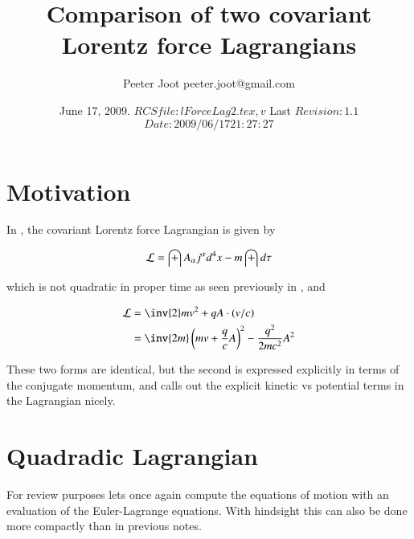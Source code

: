 \documentclass{article}
\title{Comparison of two covariant Lorentz force Lagrangians}
\author{Peeter Joot \quad peeter.joot@gmail.com }
\date{ June 17, 2009.  $RCSfile: lForceLag2.tex,v $ Last $Revision: 1.1 $ $Date: 2009/06/17 21:27:27 $ }
\begin{document}
\maketitle{}
\tableofcontents
\section{Motivation}

In \cite{poisson1999ild}, 
the covariant Lorentz force Lagrangian is given by

\begin{align}
\mathcal{L} = \int A_\alpha j^\alpha d^4 x - m \int d\tau
\end{align}

which is not quadratic in proper time as seen previously in
\cite{PJSrLorentzForce}
, and
\cite{lorentzForcePQA} 

\begin{align}
\LL
&= \inv{2} m v^2 + q A \cdot (v/c) \\
&= \inv{2 m}\left( m v + \frac{q}{c} A \right)^2 - \frac{q^2}{ 2 m c^2} A^2
\end{align}

These two forms are identical, but the second is expressed explicitly
in terms of the conjugate momentum, and calls out the explicit kinetic
vs potential terms in the Lagrangian nicely.

\section{Quadradic Lagrangian}

For review purposes lets once again compute the equations of motion 
with an evaluation of the Euler-Lagrange equations.  With hindsight
this can also be done more compactly than in previous notes.



\end{document}
